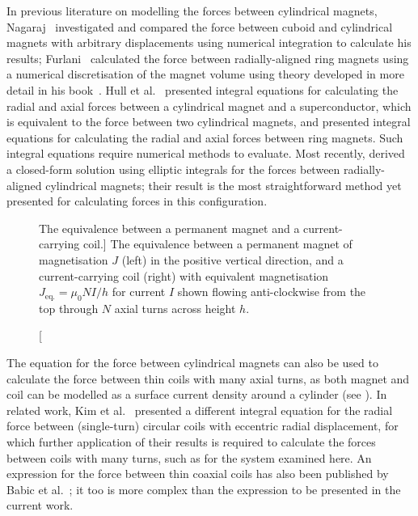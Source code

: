 \documentclass[11pt,a4paper]{memoir}
\begin{document}
In previous literature on modelling the forces between cylindrical magnets,
Nagaraj~\cite{nagaraj1988} investigated and compared the force between cuboid and cylindrical magnets with arbitrary displacements using numerical integration to calculate his results; Furlani~\cite{furlani1993-ietm,furlani1993-ietm-coupl} calculated the force between radially-aligned ring magnets using a numerical discretisation of the magnet volume using theory developed in more detail in his book~\cite{furlani2001-magnetbook}. Hull et al.~\cite{hull1999-japplphys} presented integral equations for calculating the radial and axial forces between a cylindrical magnet and a superconductor, which is equivalent to the force between two cylindrical magnets, and \textcite{bassani2006-trib-int} presented integral equations for calculating the radial and axial forces between ring magnets. Such integral equations require numerical methods to evaluate.
Most recently, \textcite{ravaud2010-ietm} derived a closed-form solution using elliptic integrals for the forces between radially-aligned cylindrical magnets; their result is the most straightforward method yet presented for calculating forces in this configuration.

\begin{figure}
\centering
{}
\caption
[The equivalence between a permanent magnet and a current-carrying coil.]
{The equivalence between a permanent magnet of magnetisation $J$ (left) in the positive vertical direction, and a current-carrying coil (right) with equivalent magnetisation $J_{\text{eq.}}=\mu_0 N I/h$ for current $I$ shown flowing anti-clockwise from the top through $N$ axial turns across height $h$.}
\end{figure}

The equation for the force between cylindrical magnets can also be used to calculate the force between thin coils with many axial turns, as both magnet and coil can be modelled as a surface current density around a cylinder (see ). In related work, Kim et al.~\cite{kim1996-ietm} presented a different integral equation for the radial force between (single-turn) circular coils with eccentric radial displacement, for which further application of their results is required to calculate the forces between coils with many turns, such as for the system examined here. An expression for the force between thin coaxial coils has also been published by Babic et al.~\cite{babic2008-ietm}; it too is more complex than the expression to be presented in the current work.
\end{document}
